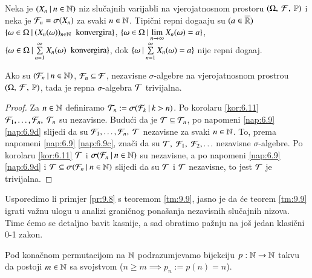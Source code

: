 \begin{pr}  \label{pr:9.8}
    Neka je $({X_n} \: | \: {n \in \mathbb{N}})$ niz slu\v cajnih varijabli na vjerojatnosnom prostoru $(\Omega, \: \mathcal{F}, \: \mathbb{P})$ i neka je $\mathcal{F}_n = \sigma({X_n})$ za svaki $n \in \mathbb{N}$.
    Tipi\v cni repni doga\dj aju su $(a \in \overline{\mathbb{R}})$ $\{{\omega \in \Omega} \: | \: {(X_n(\omega))_{n \in \mathbb{N}} \; \textnormal{ konvergira}}\}$, $\{{\omega \in \Omega} \: | \: {\lim\limits_{n \to \infty} X_n(\omega) = a}\}$, $\{{\omega \in \Omega} \: | \: {\sum\limits_{n = 1}^{\infty} X_n(\omega) \; \textnormal{ konvergira}}\}$, dok $\{{\omega} \: | \: {\sum\limits_{n = 1}^{\infty} X_n (\omega) = a}\}$ nije repni doga\dj aj.
\end{pr}

\begin{tm}  \label{tm:9.9}
    Ako su $({\mathcal{F}_n} \: | \: {n \in \mathbb{N}})$, $\mathcal{F}_n \subseteq \mathcal{F}$, nezavisne $\sigma$-algebre na vjerojatnosnom prostrou $(\Omega, \: \mathcal{F}, \: \mathbb{P})$, tada je repna $\sigma$-algebra $\mathcal{T}$ trivijalna.
\end{tm}

\begin{proof}
    Za $n \in \mathbb{N}$ definiramo $\mathcal{T}_n := \sigma({\mathcal{F}_k} \: | \: {k > n})$.
    Po korolaru \ref{kor:6.11} $\mathcal{F}_1, \ldots, \mathcal{F}_n, \; \mathcal{T}_n$ su nezavisne.
    Budu\' ci da je $\mathcal{T} \subseteq \mathcal{T}_n$, po napomeni \ref{nap:6.9} \ref{nap:6.9d} slijedi da su $\mathcal{F}_1, \ldots, \mathcal{F}_n, \; \mathcal{T}$ nezavisne za svaki $n \in \mathbb{N}$.
    To, prema napomeni \ref{nap:6.9} \ref{nap:6.9c}, zna\v ci da su $\mathcal{T}, \; \mathcal{F}_1, \; \mathcal{F}_2, \ldots$ nezavisne $\sigma$-algebre.
    Po korolaru \ref{kor:6.11} $\mathcal{T}$ i $\sigma({\mathcal{F}_n} \: | \: {n \in \mathbb{N}})$ su nezavisne, a po napomeni \ref{nap:6.9} \ref{nap:6.9d} i $\mathcal{T} \subseteq \sigma({\mathcal{F}_n} \: | \: {n \in \mathbb{N}})$ slijedi da su $\mathcal{T}$ i $\mathcal{T}$ nezavisne, to jest $\mathcal{T}$ je trivijalna.
\end{proof}

Usporedimo li primjer \ref{pr:9.8} s teoremom \ref{tm:9.9}, jasno je da \' ce teorem \ref{tm:9.9} igrati va\v znu ulogu u analizi grani\v cnog pona\v sanja nezavisnih slu\v cajnih nizova.
Time \' cemo se detaljno bavit kasnije, a sad obratimo pa\v znju na jo\v s jedan klasi\v cni 0-1 zakon.

Pod kona\v cnom permutacijom na $\mathbb{N}$ podrazumjevamo bijekciju $p: \mathbb{N} \to \mathbb{N}$ takvu da postoji $m \in \mathbb{N}$ sa svojstvom ($n \geq m \implies p_n := p(n) = n$).